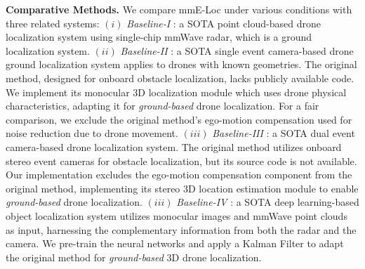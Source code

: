 \textbf{Comparative Methods.}
We compare mmE-Loc under various conditions with three related systems:
$(i)$ \textit{Baseline-I} \cite{zhao20213d}: a SOTA point cloud-based 
drone localization system using single-chip mmWave radar, which is a ground localization system.
$(ii)$ \textit{Baseline-II} \cite{falanga2020dynamic}: a SOTA single event camera-based drone ground localization system applies to drones with known geometries.
The original method, designed for onboard obstacle localization, lacks publicly available code. 
We implement its monocular 3D localization module which uses drone physical characteristics, adapting it for \textit{ground-based} drone localization.
For a fair comparison, we exclude the original method’s ego-motion compensation used for noise reduction due to drone movement.
$(iii)$ \textit{Baseline-III} \cite{falanga2020dynamic}: a SOTA dual event camera-based drone localization system. 
The original method utilizes onboard stereo event cameras for obstacle localization, but its source code is not available. Our implementation excludes the ego-motion compensation component from the original method, implementing its stereo 3D location estimation module to enable \textit{ground-based} drone localization.
$(iii)$ \textit{Baseline-IV} \cite{shuai2021millieye}:
a SOTA deep learning-based object localization system utilizes monocular images and mmWave point clouds as input, harnessing the complementary information from both the radar and the camera. 
We pre-train the neural networks and apply a Kalman Filter to adapt the original method for \textit{ground-based} 3D drone localization.




